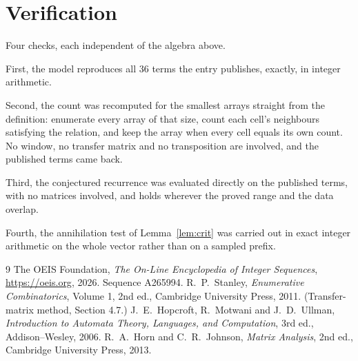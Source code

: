 \documentclass[11pt,a4paper]{article}
\theoremstyle{plain}
\theoremstyle{definition}
\begin{document}
\section{Verification}

Four checks, each independent of the algebra above.

First, the model reproduces all $36$ terms the entry publishes, exactly, in integer
arithmetic.

Second, the count was recomputed for the smallest arrays straight from the definition:
enumerate every array of that size, count each cell's neighbours satisfying the relation, and
keep the array when every cell equals its own count. No window, no transfer matrix and no
transposition are involved, and the published terms came back.

Third, the conjectured recurrence was evaluated directly on the published terms, with no
matrices involved, and holds wherever the proved range and the data overlap.

Fourth, the annihilation test of Lemma~\ref{lem:crit} was carried out in exact integer
arithmetic on the whole vector rather than on a sampled prefix.

\begin{thebibliography}{9}
 The OEIS Foundation, \emph{The On-Line Encyclopedia of Integer
Sequences}, \url{https://oeis.org}, 2026. Sequence A265994.
 R.~P.~Stanley, \emph{Enumerative Combinatorics}, Volume 1, 2nd ed.,
Cambridge University Press, 2011. (Transfer-matrix method, Section 4.7.)
 J.~E.~Hopcroft, R.~Motwani and J.~D.~Ullman, \emph{Introduction to Automata
Theory, Languages, and Computation}, 3rd ed., Addison--Wesley, 2006.
 R.~A.~Horn and C.~R.~Johnson, \emph{Matrix Analysis}, 2nd ed., Cambridge
University Press, 2013.
\end{thebibliography}
\end{document}
